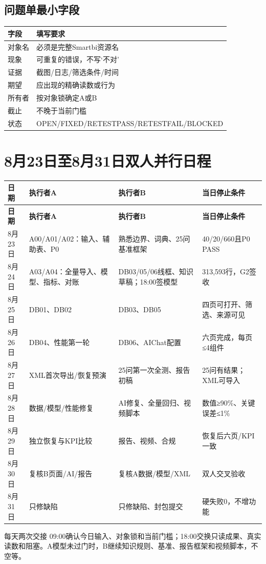 \documentclass[UTF8,openany,zihao=-4]{ctexbook}
\renewcommand{\_}{\textunderscore\allowbreak}
\begin{document}
\section{问题单最小字段}
\noindent\begin{tabularx}{\textwidth}{@{}p{}X@{}}
\toprule
\textbf{字段} & \textbf{填写要求} \\
\midrule
对象名 & 必须是完整Smartbi资源名 \\
现象 & 可重复的错误，不写‘不对’ \\
证据 & 截图/日志/筛选条件/时间 \\
期望 & 应出现的精确读数或行为 \\
所有者 & 按对象锁确定A或B \\
截止 & 不晚于当前门槛 \\
状态 & OPEN/FIXED/RETEST\_PASS/RETEST\_FAIL/BLOCKED \\
\bottomrule
\end{tabularx}
\chapter{8月23日至8月31日双人并行日程}
\begin{longtable}{@{}p{}p{}p{}p{}@{}}
\toprule
\textbf{日期} & \textbf{执行者A} & \textbf{执行者B} & \textbf{当日停止条件} \\
\midrule
\endfirsthead
\toprule
\textbf{日期} & \textbf{执行者A} & \textbf{执行者B} & \textbf{当日停止条件} \\
\midrule
\endhead
8月23日 & A00/A01/A02：输入、辅助表、P0 & 熟悉边界、词典、25问基准框架 & 40/20/660且P0 PASS \\
8月24日 & A03/A04：全量导入、模型、指标、对账 & DB03/05/06线框、知识草稿；18:00签模型 & 313,593行，G2签收 \\
8月25日 & DB01、DB02 & DB03、DB05 & 四页可打开、筛选、来源可见 \\
8月26日 & DB04、性能第一轮 & DB06、AIChat配置 & 六页完成，每页≤4组件 \\
8月27日 & XML首次导出/恢复预演 & 25问第一次全测、报告初稿 & 25问有结果；XML可导入 \\
8月28日 & 数据/模型/性能修复 & AI修复、全量回归、视频脚本 & 数值≥90\%、关键误差≤1\% \\
8月29日 & 独立恢复与KPI比较 & 报告、视频、合规 & 恢复后六页/KPI一致 \\
8月30日 & 复核B页面/AI/报告 & 复核A数据/模型/XML & 双人交叉验收 \\
8月31日 & 只修缺陷 & 只修缺陷、封包提交 & 硬失败0，不增功能 \\
\bottomrule
\end{longtable}
\begin{statusbox}{每天两次交接}
09:00确认今日输入、对象锁和当前门槛；18:00交换只读成果、真实读数和阻塞。A模型未过门时，B继续知识规则、基准、报告框架和视频脚本，不空等。

\end{statusbox}
\end{document}
